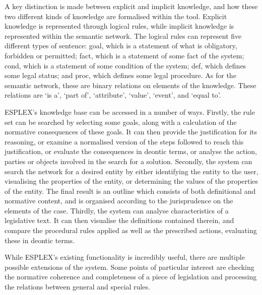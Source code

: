 \documentclass{l4proj}
\begin{document}
A key distinction is made between explicit and implicit knowledge, and how these two different kinds of knowledge are formalised within the tool. Explicit knowledge is represented through logical rules, while implicit knowledge is represented within the semantic network. The logical rules can represent five different types of sentence: goal, which is a statement of what is obligatory, forbidden or permitted; fact, which is a statement of some fact of the system; cond, which is a statement of some condition of the system; def, which defines some legal status; and proc, which defines some legal procedure. As for the semantic network, these are binary relations on elements of the knowledge. These relations are `is a', `part of', `attribute', `value', `event', and `equal to'. 

ESPLEX's knowledge base can be accessed in a number of ways. Firstly, the rule set can be searched by selecting some goals, along with a calculation of the normative consequences of these goals. It can then provide the justification for its reasoning, or examine a normalised version of the steps followed to reach this justification, or evaluate the consequences in deontic terms, or analyse the action, parties or objects involved in the search for a solution. Secondly, the system can search the network for a desired entity by either identifying the entity to the user, visualising the properties of the entity, or determining the values of the properties of the entity. The final result is an outline which consists of both definitional and normative content, and is organised according to the jurisprudence on the elements of the case. Thirdly, the system can analyse characteristics of a legislative text. It can then visualise the definitions contained therein, and compare the procedural rules applied as well as the prescribed actions, evaluating these in deontic terms. 

While ESPLEX's existing functionality is incredibly useful, there are multiple possible extensions of the system. Some points of particular interest are checking the normative coherence and completeness of a piece of legislation and processing the relations between general and special rules. %

\end{document}
